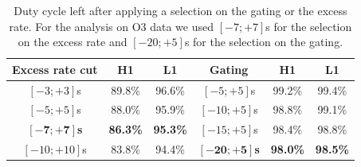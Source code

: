 \begin{table}
  \centering
  \begin{tabular}{c|c|c||c|c|c}
    Excess rate cut & H1 & L1 & Gating & H1 & L1 \\ \hline
    $\left[-3;+3\right]$s & 89.8\% & 96.6\% & $\left[-5;+5\right]$s & 99.2\% & 99.4\% \\
    $\left[-5;+5\right]$s & 88.0\% & 95.9\% & $\left[-10;+5\right]$s & 98.8\% & 99.1\% \\
    $\boldsymbol{\left[-7;+7\right]}$\textbf{s} & \textbf{86.3\%} & \textbf{95.3\%} & $\left[-15;+5\right]$s & 98.4\% & 98.8\% \\
    $\left[-10;+10\right]$s & 83.8\% & 94.4\% & $\boldsymbol{\left[-20;+5\right]}$\textbf{s} & \textbf{98.0\%} & \textbf{98.5\%} \\
  \end{tabular}
  \caption{Duty cycle left after applying a selection on the gating or the excess rate.
  For the analysis on O3 data we used $\left[-7;+7\right]$s for the selection on the excess rate and $\left[-20;+5\right]$s for the selection on the gating.}
  \label{tab:dc_cut_O4}
\end{table}

